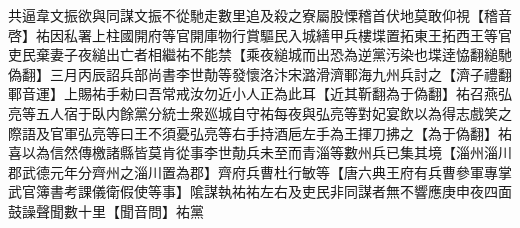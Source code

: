 共逼韋文振欲與同謀文振不從馳走數里追及殺之寮屬股慄稽首伏地莫敢仰視【稽音啓】祐因私署上柱國開府等官開庫物行賞驅民入城繕甲兵樓堞置拓東王拓西王等官吏民棄妻子夜縋出亡者相繼祐不能禁【乘夜縋城而出恐為逆黨汚染也堞逹恊翻縋馳偽翻】三月丙辰詔兵部尚書李世勣等發懷洛汴宋潞滑濟鄆海九州兵討之【濟子禮翻鄆音運】上賜祐手勑曰吾常戒汝勿近小人正為此耳【近其靳翻為于偽翻】祐召燕弘亮等五人宿于臥内餘黨分統士衆廵城自守祐每夜與弘亮等對妃宴飲以為得志戲笑之際語及官軍弘亮等曰王不須憂弘亮等右手持酒巵左手為王揮刀拂之【為于偽翻】祐喜以為信然傳檄諸縣皆莫肯從事李世勣兵未至而青淄等數州兵已集其境【淄州淄川郡武德元年分齊州之淄川置為郡】齊府兵曹杜行敏等【唐六典王府有兵曹參軍專掌武官簿書考課儀衛假使等事】隂謀執祐祐左右及吏民非同謀者無不響應庚申夜四面鼓譟聲聞數十里【聞音問】祐黨